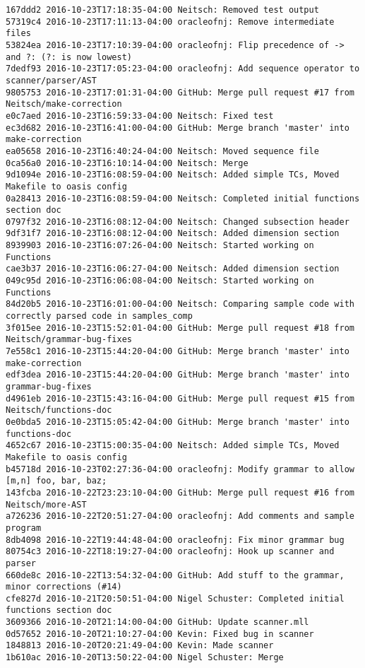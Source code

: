 \begin{lstlisting}
167ddd2 2016-10-23T17:18:35-04:00 Neitsch: Removed test output
57319c4 2016-10-23T17:11:13-04:00 oracleofnj: Remove intermediate files
53824ea 2016-10-23T17:10:39-04:00 oracleofnj: Flip precedence of -> and ?: (?: is now lowest)
7dedf93 2016-10-23T17:05:23-04:00 oracleofnj: Add sequence operator to scanner/parser/AST
9805753 2016-10-23T17:01:31-04:00 GitHub: Merge pull request #17 from Neitsch/make-correction
e0c7aed 2016-10-23T16:59:33-04:00 Neitsch: Fixed test
ec3d682 2016-10-23T16:41:00-04:00 GitHub: Merge branch 'master' into make-correction
ea05658 2016-10-23T16:40:24-04:00 Neitsch: Moved sequence file
0ca56a0 2016-10-23T16:10:14-04:00 Neitsch: Merge
9d1094e 2016-10-23T16:08:59-04:00 Neitsch: Added simple TCs, Moved Makefile to oasis config
0a28413 2016-10-23T16:08:59-04:00 Neitsch: Completed initial functions section doc
0797f32 2016-10-23T16:08:12-04:00 Neitsch: Changed subsection header
9df31f7 2016-10-23T16:08:12-04:00 Neitsch: Added dimension section
8939903 2016-10-23T16:07:26-04:00 Neitsch: Started working on Functions
cae3b37 2016-10-23T16:06:27-04:00 Neitsch: Added dimension section
049c95d 2016-10-23T16:06:08-04:00 Neitsch: Started working on Functions
84d20b5 2016-10-23T16:01:00-04:00 Neitsch: Comparing sample code with correctly parsed code in samples_comp
3f015ee 2016-10-23T15:52:01-04:00 GitHub: Merge pull request #18 from Neitsch/grammar-bug-fixes
7e558c1 2016-10-23T15:44:20-04:00 GitHub: Merge branch 'master' into make-correction
edf3dea 2016-10-23T15:44:20-04:00 GitHub: Merge branch 'master' into grammar-bug-fixes
d4961eb 2016-10-23T15:43:16-04:00 GitHub: Merge pull request #15 from Neitsch/functions-doc
0e0bda5 2016-10-23T15:05:42-04:00 GitHub: Merge branch 'master' into functions-doc
4652c67 2016-10-23T15:00:35-04:00 Neitsch: Added simple TCs, Moved Makefile to oasis config
b45718d 2016-10-23T02:27:36-04:00 oracleofnj: Modify grammar to allow [m,n] foo, bar, baz;
143fcba 2016-10-22T23:23:10-04:00 GitHub: Merge pull request #16 from Neitsch/more-AST
a726236 2016-10-22T20:51:27-04:00 oracleofnj: Add comments and sample program
8db4098 2016-10-22T19:44:48-04:00 oracleofnj: Fix minor grammar bug
80754c3 2016-10-22T18:19:27-04:00 oracleofnj: Hook up scanner and parser
660de8c 2016-10-22T13:54:32-04:00 GitHub: Add stuff to the grammar, minor corrections (#14)
cfe827d 2016-10-21T20:50:51-04:00 Nigel Schuster: Completed initial functions section doc
3609366 2016-10-20T21:14:00-04:00 GitHub: Update scanner.mll
0d57652 2016-10-20T21:10:27-04:00 Kevin: Fixed bug in scanner
1848813 2016-10-20T20:21:49-04:00 Kevin: Made scanner
1b610ac 2016-10-20T13:50:22-04:00 Nigel Schuster: Merge

\end{lstlisting}

